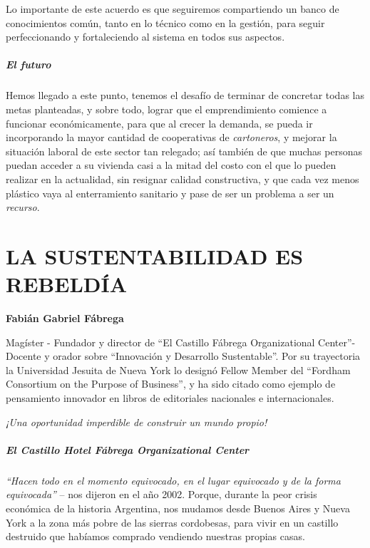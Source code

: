 \documentclass[
]{article}
\begin{document}
Lo importante de este acuerdo es que seguiremos compartiendo un banco de
conocimientos común, tanto en lo técnico como en la gestión, para seguir
perfeccionando y fortaleciendo al sistema en todos sus aspectos.

\hypertarget{el-futuro}{%
\subparagraph{El futuro}\label{el-futuro}}

Hemos llegado a este punto, tenemos el desafío de terminar de concretar
todas las metas planteadas, y sobre todo, lograr que el emprendimiento
comience a funcionar económicamente, para que al crecer la demanda, se
pueda ir incorporando la mayor cantidad de cooperativas de
\emph{cartoneros}, y mejorar la situación laboral de este sector tan
relegado; así también de que muchas personas puedan acceder a su
vivienda casi a la mitad del costo con el que lo pueden realizar en la
actualidad, sin resignar calidad constructiva, y que cada vez menos
plástico vaya al enterramiento sanitario y pase de ser un problema a ser
un \emph{recurso}.

\cleardoublepage

\hypertarget{la-sustentabilidad-es-rebelduxeda}{%
\section{LA SUSTENTABILIDAD ES
REBELDÍA}\label{la-sustentabilidad-es-rebelduxeda}}

\textbf{Fabián Gabriel Fábrega}

Magíster - Fundador y director de ``El Castillo Fábrega Organizational
Center''- Docente y orador sobre ``Innovación y Desarrollo
Sustentable''. Por su trayectoria la Universidad Jesuita de Nueva York
lo designó Fellow Member del ``Fordham Consortium on the Purpose of
Business'', y ha sido citado como ejemplo de pensamiento innovador en
libros de editoriales nacionales e internacionales.

\emph{¡Una oportunidad imperdible de construir un mundo propio!}

\hypertarget{el-castillo-hotel-fuxe1brega-organizational-center}{%
\subparagraph{El Castillo Hotel Fábrega Organizational
Center}\label{el-castillo-hotel-fuxe1brega-organizational-center}}

\emph{``Hacen todo en el momento equivocado, en el lugar equivocado y de
la forma equivocada''} -- nos dijeron en el año 2002. Porque, durante la
peor crisis económica de la historia Argentina, nos mudamos desde Buenos
Aires y Nueva York a la zona más pobre de las sierras cordobesas, para
vivir en un castillo destruido que habíamos comprado vendiendo nuestras
propias casas.
\end{document}

